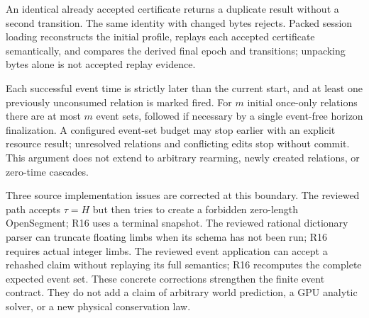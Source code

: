 An identical already accepted certificate returns a duplicate result
without a second transition. The same identity with changed bytes rejects.
Packed session loading reconstructs the initial profile, replays each
accepted certificate semantically, and compares the derived final epoch
and transitions; unpacking bytes alone is not accepted replay evidence.

Each successful event time is strictly later than the current start,
and at least one previously unconsumed relation is marked fired. For $m$
initial once-only relations there are at most $m$ event sets, followed
if necessary by a single event-free horizon finalization. A configured
event-set budget may stop earlier with an explicit resource result;
unresolved relations and conflicting edits stop without commit. This
argument does not extend to arbitrary rearming, newly created relations,
or zero-time cascades.

Three source implementation issues are corrected at this boundary.
The reviewed path accepts $\tau=H$ but then tries to create a forbidden
zero-length OpenSegment; R16 uses a terminal snapshot. The reviewed
rational dictionary parser can truncate floating limbs when its schema
has not been run; R16 requires actual integer limbs. The reviewed event
application can accept a rehashed claim without replaying its full
semantics; R16 recomputes the complete expected event set. These concrete
corrections strengthen the finite event contract. They do not add a
claim of arbitrary world prediction, a GPU analytic solver, or a new
physical conservation law.

